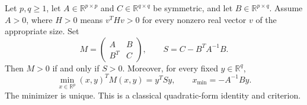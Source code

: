 Let $p,q\geq1$, let $A\in\mathbb R^{p\times p}$ and $C\in\mathbb R^{q\times q}$
be symmetric, and let $B\in\mathbb R^{p\times q}$. Assume $A>0$, where
$H>0$ means $v^THv>0$ for every nonzero real vector $v$ of the appropriate size.
Set
\[
 M=\begin{pmatrix}A&B\\B^T&C\end{pmatrix},\qquad S=C-B^TA^{-1}B.
\]
Then $M>0$ if and only if $S>0$. Moreover, for every fixed $y\in\mathbb R^q$,
\[
 \min_{x\in\mathbb R^p}(x,y)^TM(x,y)=y^TSy,
 \qquad x_{\min}=-A^{-1}By.
\]
The minimizer is unique. This is a classical quadratic-form identity and criterion.